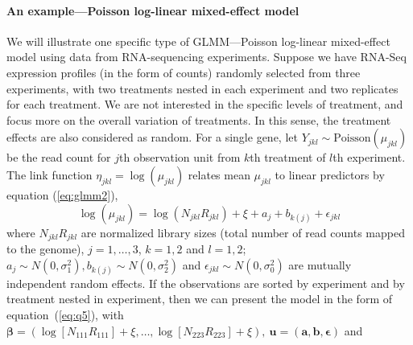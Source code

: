 \paragraph{An example---Poisson log-linear mixed-effect model}\label{poisson} 
We will illustrate one specific type of GLMM---Poisson log-linear mixed-effect model using data
from RNA-sequencing experiments. Suppose we have RNA-Seq expression profiles (in the form of counts)
randomly selected from three experiments, with two treatments nested in each experiment and two
replicates for each treatment. We are not interested in the specific levels of treatment, and focus
more on the overall variation of treatments. In this sense, the treatment effects are also
considered as random. For a single gene, let $Y_{jkl}\sim \text{Poisson}(\mu_{jkl})$ be the read
count for $j$th observation unit from $k$th treatment of $l$th experiment. The link function
$\eta_{jkl} = \log (\mu_{jkl})$ relates mean $\mu_{jkl}$ to linear predictors by equation
(\ref{eq:glmm2}),  
\begin{equation}\label{eq:example}
	\log (\mu_{jkl}) = \log (N_{jkl}R_{jkl}) + \xi + a_{j} + b_{k(j)} + \epsilon_{jkl}
\end{equation}
where $N_{jkl}R_{jkl}$ are normalized library sizes (total number of read counts mapped to the
genome),  $j=1, \ldots,  3$, $k=1, 2$ and $l=1, 2$; $a_j \sim N(0, \sigma_1^2), b_{k(j)}\sim N(0,
\sigma_2^2)$ and $\epsilon_{jkl}\sim N(0, \sigma_0^2)$ are mutually independent random effects. If
the observations are sorted by experiment and by treatment nested in experiment, then we can present
the model in the form of equation~(\ref{eq:q5}), with  $\bm \beta = (\log [N_{111}R_{111}]  +
\xi,\ldots, \log [N_{223}R_{223}]  + \xi), ~\bm u = (\bm a, \bm b, \bm \epsilon)$ and 

